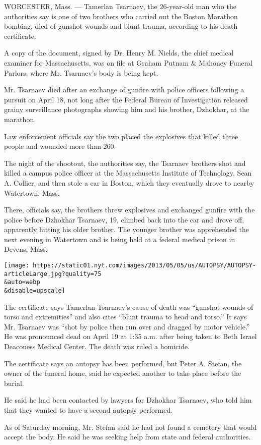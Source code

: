 WORCESTER, Mass. --- Tamerlan Tsarnaev, the 26-year-old man who the
authorities say is one of two brothers who carried out the Boston
Marathon bombing, died of gunshot wounds and blunt trauma, according to
his death certificate.

A copy of the document, signed by Dr. Henry M. Nields, the chief medical
examiner for Massachusetts, was on file at Graham Putnam \& Mahoney
Funeral Parlors, where Mr. Tsarnaev's body is being kept.

Mr. Tsarnaev died after an exchange of gunfire with police officers
following a pursuit on April 18, not long after the Federal Bureau of
Investigation released grainy surveillance photographs showing him and
his brother, Dzhokhar, at the marathon.

Law enforcement officials say the two placed the explosives that killed
three people and wounded more than 260.

The night of the shootout, the authorities say, the Tsarnaev brothers
shot and killed a campus police officer at the Massachusetts Institute
of Technology, Sean A. Collier, and then stole a car in Boston, which
they eventually drove to nearby Watertown, Mass.

There, officials say, the brothers threw explosives and exchanged
gunfire with the police before Dzhokhar Tsarnaev, 19, climbed back into
the car and drove off, apparently hitting his older brother. The younger
brother was apprehended the next evening in Watertown and is being held
at a federal medical prison in Devens, Mass.

\texttt{[image: https://static01.nyt.com/images/2013/05/05/us/AUTOPSY/AUTOPSY-articleLarge.jpg?quality=75\\\&auto=webp\\\&disable=upscale]}

The certificate says Tamerlan Tsarnaev's cause of death was ``gunshot
wounds of torso and extremities'' and also cites ``blunt trauma to head
and torso.'' It says Mr. Tsarnaev was ``shot by police then run over and
dragged by motor vehicle.'' He was pronounced dead on April 19 at 1:35
a.m. after being taken to Beth Israel Deaconess Medical Center. The
death was ruled a homicide.

The certificate says an autopsy has been performed, but Peter A. Stefan,
the owner of the funeral home, said he expected another to take place
before the burial.

He said he had been contacted by lawyers for Dzhokhar Tsarnaev, who told
him that they wanted to have a second autopsy performed.

As of Saturday morning, Mr. Stefan said he had not found a cemetery that
would accept the body. He said he was seeking help from state and
federal authorities.

